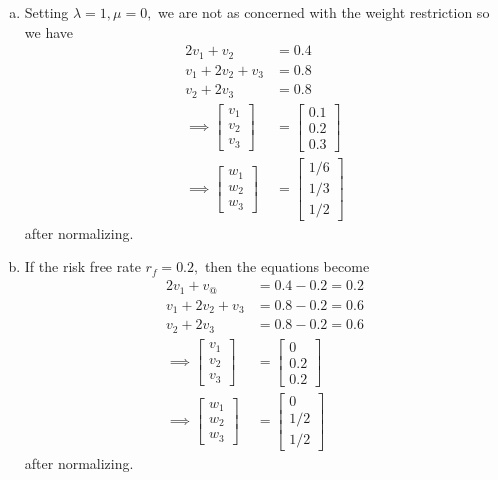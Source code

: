 \documentclass{article}
\begin{document}
\begin{enumerate}
\begin{enumerate}[(a)]
			\item 
				\begin{soln}
					Setting $\lambda=1, \mu=0,$ we are not as concerned with the weight restriction so we have
					\begin{align*}
						2v_1 + v_2 &= 0.4 \\
						v_1+2v_2+v_3 &= 0.8 \\
						v_2 + 2v_3 &= 0.8 \\
						\implies\begin{bmatrix}
							v_1 \\ v_2 \\ v_3
						\end{bmatrix} &= \begin{bmatrix}
							0.1 \\ 0.2 \\ 0.3
						\end{bmatrix} \\
						\implies \begin{bmatrix}
							w_1 \\ w_2 \\ w_3
						\end{bmatrix} &= \begin{bmatrix}
							1/6 \\ 1/3 \\ 1/2
						\end{bmatrix}
					\end{align*}
					after normalizing.
				\end{soln}

			\item
				\begin{soln}
					If the risk free rate $r_f=0.2,$ then the equations become
					\begin{align*}
						2v_1+v_@ &= 0.4-0.2=0.2 \\
						v_1+2v_2+v_3 &= 0.8-0.2=0.6 \\
						v_2+2v_3 &= 0.8-0.2 = 0.6 \\
						\implies \begin{bmatrix}
							v_1 \\ v_2 \\ v_3
						\end{bmatrix} &= \begin{bmatrix}
							0 \\ 0.2 \\ 0.2
						\end{bmatrix} \\
						\implies \begin{bmatrix}
							w_1 \\ w_2 \\ w_3
						\end{bmatrix} &= \begin{bmatrix}
							0 \\ 1/2 \\ 1/2
						\end{bmatrix}
					\end{align*}
					after normalizing.
				\end{soln}


\end{enumerate}
\end{enumerate}
\end{document}
